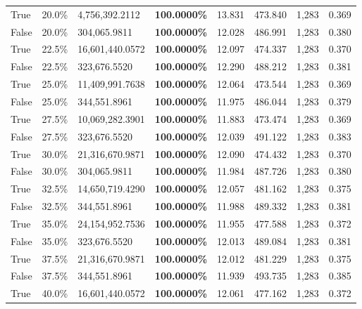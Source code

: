 \begin{table}[H]
\begin{tabular}{lllrllll}
\cline{1-8}
True & 20.0\% & 4,756,392.2112 & \bfseries \color{red} 100.0000\% & 13.831 & 473.840 & 1,283 & 0.369 \\
\cline{1-8}
False & 20.0\% & \color{red} 304,065.9811 & \bfseries \color{red} 100.0000\% & 12.028 & 486.991 & 1,283 & 0.380 \\
\cline{1-8}
True & 22.5\% & 16,601,440.0572 & \bfseries \color{red} 100.0000\% & 12.097 & 474.337 & 1,283 & 0.370 \\
\cline{1-8}
False & 22.5\% & 323,676.5520 & \bfseries \color{red} 100.0000\% & 12.290 & 488.212 & 1,283 & 0.381 \\
\cline{1-8}
True & 25.0\% & 11,409,991.7638 & \bfseries \color{red} 100.0000\% & 12.064 & 473.544 & 1,283 & 0.369 \\
\cline{1-8}
False & 25.0\% & 344,551.8961 & \bfseries \color{red} 100.0000\% & 11.975 & 486.044 & 1,283 & 0.379 \\
\cline{1-8}
True & 27.5\% & 10,069,282.3901 & \bfseries \color{red} 100.0000\% & 11.883 & 473.474 & 1,283 & 0.369 \\
\cline{1-8}
False & 27.5\% & 323,676.5520 & \bfseries \color{red} 100.0000\% & 12.039 & 491.122 & 1,283 & 0.383 \\
\cline{1-8}
True & 30.0\% & 21,316,670.9871 & \bfseries \color{red} 100.0000\% & 12.090 & 474.432 & 1,283 & 0.370 \\
\cline{1-8}
False & 30.0\% & \color{red} 304,065.9811 & \bfseries \color{red} 100.0000\% & 11.984 & 487.726 & 1,283 & 0.380 \\
\cline{1-8}
True & 32.5\% & 14,650,719.4290 & \bfseries \color{red} 100.0000\% & 12.057 & 481.162 & 1,283 & 0.375 \\
\cline{1-8}
False & 32.5\% & 344,551.8961 & \bfseries \color{red} 100.0000\% & 11.988 & 489.332 & 1,283 & 0.381 \\
\cline{1-8}
True & 35.0\% & 24,154,952.7536 & \bfseries \color{red} 100.0000\% & 11.955 & 477.588 & 1,283 & 0.372 \\
\cline{1-8}
False & 35.0\% & 323,676.5520 & \bfseries \color{red} 100.0000\% & 12.013 & 489.084 & 1,283 & 0.381 \\
\cline{1-8}
True & 37.5\% & 21,316,670.9871 & \bfseries \color{red} 100.0000\% & 12.012 & 481.229 & 1,283 & 0.375 \\
\cline{1-8}
False & 37.5\% & 344,551.8961 & \bfseries \color{red} 100.0000\% & 11.939 & 493.735 & 1,283 & 0.385 \\
\cline{1-8}
True & 40.0\% & 16,601,440.0572 & \bfseries \color{red} 100.0000\% & 12.061 & 477.162 & 1,283 & 0.372 \\

\end{tabular}
\end{table}
